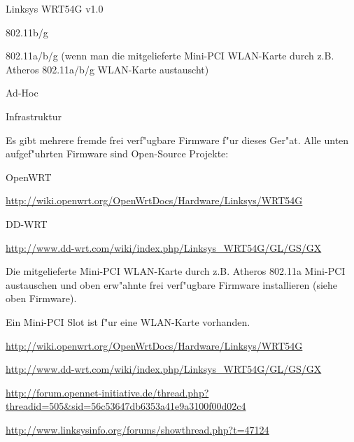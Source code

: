 %
%
\begin{wlandevice}{Linksys WRT54G v1.0}


\begin{wlanieeestandard}
\item 802.11b/g
\item 802.11a/b/g (wenn man die mitgelieferte Mini-PCI WLAN-Karte
durch z.B. Atheros 802.11a/b/g WLAN-Karte austauscht)
\end{wlanieeestandard}

\begin{wlanmode}
\item Ad-Hoc
\item Infrastruktur
\end{wlanmode}

\begin{wlanfirmware}
\item
Es gibt mehrere fremde frei verf"ugbare Firmware f"ur dieses Ger"at.
Alle unten aufgef"uhrten Firmware sind Open-Source Projekte:

OpenWRT

\url{http://wiki.openwrt.org/OpenWrtDocs/Hardware/Linksys/WRT54G}

DD-WRT

\url{http://www.dd-wrt.com/wiki/index.php/Linksys_WRT54G/GL/GS/GX}
\end{wlanfirmware}


\begin{wlaninstall}
\item
Die mitgelieferte Mini-PCI WLAN-Karte durch z.B. Atheros 802.11a Mini-PCI
austauschen und oben erw"ahnte frei verf"ugbare Firmware installieren
(siehe oben Firmware).
\end{wlaninstall}

\begin{wlanextrainfo}
\item
Ein Mini-PCI Slot ist f"ur eine WLAN-Karte vorhanden.
\end{wlanextrainfo}

\begin{wlanlink}
\item \url{http://wiki.openwrt.org/OpenWrtDocs/Hardware/Linksys/WRT54G}
\item \url{http://www.dd-wrt.com/wiki/index.php/Linksys_WRT54G/GL/GS/GX}
\item \url{http://forum.opennet-initiative.de/thread.php?threadid=505&sid=56c53647db6353a41e9a3100f00d02c4}
\item \url{http://www.linksysinfo.org/forums/showthread.php?t=47124}
\end{wlanlink}

\end{wlandevice}

